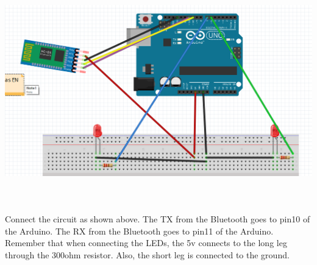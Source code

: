 \documentclass[14pt, oneside]{memoir}
\begin{document}
\includegraphics[width=6.89091in,height=3.81659in]{circuit_images/bluetooth.png}


Connect the circuit as shown above. The TX from the Bluetooth goes to
pin10 of the Arduino. The RX from the Bluetooth goes to pin11 of the
Arduino.
\\
Remember that when connecting the LEDs, the 5v connects to the long leg
through the 300ohm resistor. Also, the short leg is connected to the
ground.


\end{document}
